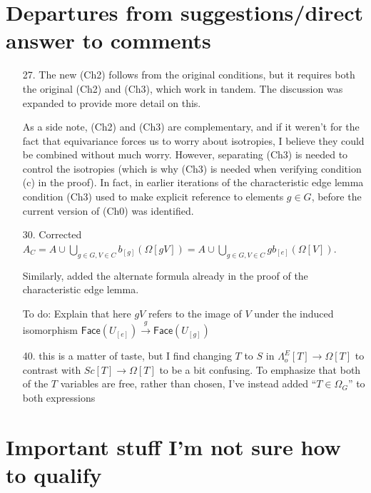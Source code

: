 \documentclass{article}
\begin{document}
\section{Departures from suggestions/direct answer to comments}

\begin{itemize}
\item[27.] The new (Ch2) follows from the original conditions, but it requires both the original (Ch2) and (Ch3), which work in tandem. The discussion was expanded to provide more detail on this. 

As a side note, (Ch2) and (Ch3) are complementary, and if it weren't for the fact that equivariance forces us to worry about isotropies, I believe they could be combined without much worry.
However, separating (Ch3) is needed to control the isotropies (which is why (Ch3) is needed when verifying condition (c) in the proof). In fact, in earlier iterations of the characteristic edge lemma condition (Ch3) used to make explicit reference to elements $g \in G$, before the current version of (Ch0) was identified.

\item[30.] Corrected $A_C = A \cup \bigcup_{g\in G,V \in C} b_{[g]}(\Omega[gV]) = 
A \cup \bigcup_{g\in G,V \in C} g b_{[e]}(\Omega[V])$.

Similarly, added the alternate formula already in the proof of the characteristic edge lemma.

{\color{red} To do:} Explain that here $gV$ refers to the image of $V$ under the induced isomorphism 
$\mathsf{Face}(U_{[e]}) \xrightarrow{g} \mathsf{Face}(U_{[g]})$

\item[40.] this is a matter of taste, but I find changing $T$ to $S$ in $\Lambda^E_o[T] \to \Omega[T]$ to contrast with $Sc[T] \to \Omega[T]$ to be a bit confusing. To emphasize that both of the $T$ variables are free, rather than chosen, I've instead added ``$T\in \Omega_G$'' to both expressions 
\end{itemize}



\section{Important stuff I'm not sure how to qualify}
\end{document}

